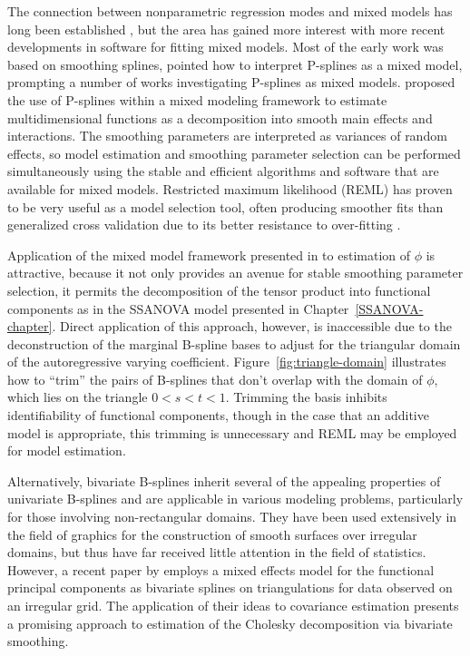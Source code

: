 \bigskip

The connection between nonparametric regression modes and mixed models has long been established \citep{green1987penalized}, but the area has gained more interest with more recent developments in software for fitting mixed models. Most of the early work was based on smoothing splines, \cite{eilers1999discussion} pointed how to
interpret P-splines as a mixed model, prompting a number of works investigating P-splines as mixed models. \cite{lee2011p} proposed the use of P-splines within a mixed modeling framework to estimate multidimensional functions as a decomposition into smooth main effects and interactions. The smoothing parameters are interpreted as variances of random effects, so model estimation and smoothing parameter selection can be performed simultaneously using the stable and efficient algorithms and software that are available for mixed models. Restricted maximum likelihood (REML) has proven to be very useful as a model selection tool, often producing smoother fits than generalized cross validation due to its better resistance to over-fitting \citep{wand2003semiparametric}. 

\bigskip

Application of the mixed model framework presented in \cite{lee2011p} to estimation of $\phi$ is attractive, because it not only provides an avenue for stable smoothing parameter selection, it permits the decomposition of the tensor product into functional components as in the SSANOVA model presented in Chapter~\ref{SSANOVA-chapter}. Direct application of this approach, however, is inaccessible due to the deconstruction of the marginal B-spline bases to adjust for the triangular domain of the autoregressive varying coefficient. Figure~\ref{fig:triangle-domain} illustrates how to ``trim'' the pairs of B-splines that don't overlap with the domain of $\phi$, which lies on the triangle $0 < s < t< 1$. Trimming the basis inhibits identifiability of functional components, though in the case that an additive model is appropriate, this trimming is unnecessary and REML may be employed for model estimation.

\bigskip

Alternatively, bivariate B-splines inherit several of the appealing properties of univariate B-splines and are applicable in various modeling problems, particularly for those involving non-rectangular domains. They have been used extensively in the field of graphics for the construction of smooth surfaces over irregular domains, but thus have far received little attention in the field of statistics. However, a recent paper by \cite{zhou2014principal} employs a mixed effects model for the functional principal components as bivariate splines on triangulations for data observed on an irregular grid. The application of their ideas to covariance estimation presents a promising approach to estimation of the Cholesky decomposition via bivariate smoothing.  


